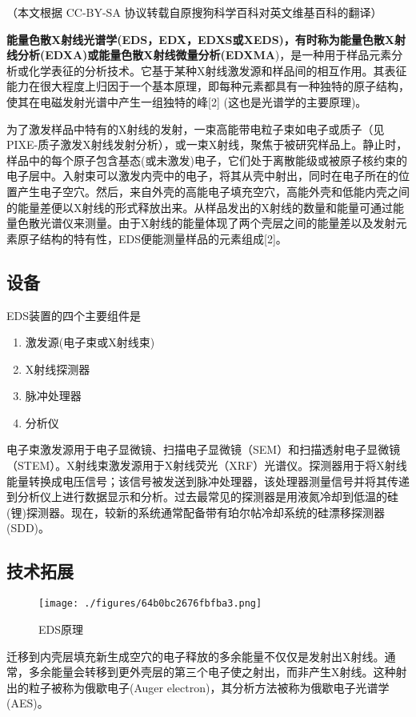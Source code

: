 
（本文根据 CC-BY-SA 协议转载自原搜狗科学百科对英文维基百科的翻译）

\textbf{能量色散X射线光谱学(EDS，EDX，EDXS或XEDS)，有时称为能量色散X射线分析(EDXA)或能量色散X射线微量分析(EDXMA})，是一种用于样品元素分析或化学表征的分析技术。它基于某种X射线激发源和样品间的相互作用。其表征能力在很大程度上归因于一个基本原理，即每种元素都具有一种独特的原子结构，使其在电磁发射光谱中产生一组独特的峰[2] (这也是光谱学的主要原理)。

为了激发样品中特有的X射线的发射，一束高能带电粒子束如电子或质子（见PIXE-质子激发X射线发射分析），或一束X射线，聚焦于被研究样品上。静止时，样品中的每个原子包含基态(或未激发)电子，它们处于离散能级或被原子核约束的电子层中。入射束可以激发内壳中的电子，将其从壳中射出，同时在电子所在的位置产生电子空穴。然后，来自外壳的高能电子填充空穴，高能外壳和低能内壳之间的能量差便以X射线的形式释放出来。从样品发出的X射线的数量和能量可通过能量色散光谱仪来测量。由于X射线的能量体现了两个壳层之间的能量差以及发射元素原子结构的特有性，EDS便能测量样品的元素组成[2]。

\subsection{设备}
EDS装置的四个主要组件是
\begin{enumerate}
\item 激发源(电子束或X射线束)
\item X射线探测器
\item 脉冲处理器
\item 分析仪
\end{enumerate}
电子束激发源用于电子显微镜、扫描电子显微镜（SEM）和扫描透射电子显微镜（STEM）。X射线束激发源用于X射线荧光（XRF）光谱仪。探测器用于将X射线能量转换成电压信号；该信号被发送到脉冲处理器，该处理器测量信号并将其传递到分析仪上进行数据显示和分析。过去最常见的探测器是用液氮冷却到低温的硅(锂)探测器。现在，较新的系统通常配备带有珀尔帖冷却系统的硅漂移探测器(SDD)。

\subsection{技术拓展}
\begin{figure}[ht]
\centering
\texttt{[image: ./figures/64b0bc2676fbfba3.png]}
\caption{EDS原理} \label{fig_Xgpx_1}
\end{figure}
迁移到内壳层填充新生成空穴的电子释放的多余能量不仅仅是发射出X射线。通常，多余能量会转移到更外壳层的第三个电子使之射出，而非产生X射线。这种射出的粒子被称为俄歇电子(Auger electron)，其分析方法被称为俄歇电子光谱学(AES)。

